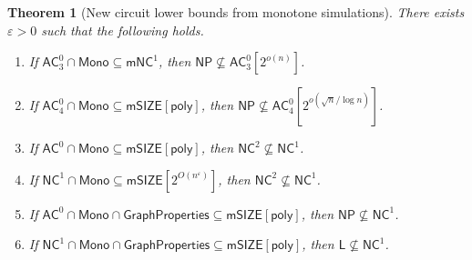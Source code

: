 \documentclass[10pt,a4paper]{article}
\newtheorem{theorem}{Theorem}[section]
\newcommand{\eps}{\varepsilon}
\newcommand{\poly}{\mathsf{poly}}
\newcommand{\complexityfont}[1]{\mathsf{#1}}
\newcommand{\monclass}[1]{\mathsf{m}#1}
\def\mNC          {\monclass{\NC}}
\def\NP           {\complexityfont{NP}}
\def\AC           {\complexityfont{AC}}
\def\NC           {\complexityfont{NC}}
\def\SIZE         {\complexityfont{SIZE}}
\def\mSIZE        {\monclass{\SIZE}}
\renewcommand{\L} {\complexityfont{L}}
\newcommand{\semMon}[1]{#1 \cap \monfns}
\newcommand{\monfns}{\mathsf{Mono}}
\newcommand{\GraphPpts}{\mathsf{GraphProperties}}
\def\sseq{\subseteq}
\begin{document}
\begin{theorem}[New circuit lower bounds from monotone simulations]
    \label{thm:simul_consequences_intro}
    There exists $\eps > 0$
    such that the following holds.
    \begin{enumerate}
        \item 
            If 
            $\semMon{\AC^0_3} 
            \subseteq \mNC^1$,
            then 
            $\NP 
            \not\sseq
            \AC^0_3[2^{o(n)}]$.
        \item 
            If 
            $\semMon{\AC^0_4} 
            \subseteq \mSIZE[\poly]$,
            then 
            $\NP 
            \not\sseq
            \AC^0_4[ 2^{o( \sqrt{n}/\log n )} ]$.
        \item If 
            $\semMon{\AC^0}  
            \sseq 
            \mSIZE[\poly]$,
            then
            $\NC^2 
            \not\sseq
            \NC^1$.
        \item 
            If $\semMon{\NC^1} \sseq \mSIZE[2^{O(n^\eps)}]$,
            then 
            $\NC^2 
            \not\sseq
            \NC^1$.
        \item 
            If 
            $\semMon{\AC^0} \cap \GraphPpts \subseteq \mSIZE[\mathsf{poly}]$,
            then $\NP \not\sseq \NC^1$.
        \item 
            If $\semMon{\NC^1} \cap \GraphPpts \sseq \mSIZE[\mathsf{poly}]$,
            then 
            $\L
            \not\sseq
            \NC^1$.
    \end{enumerate}
\end{theorem}
\end{document}
